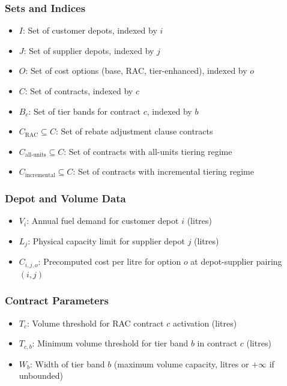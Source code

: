 \subsubsection{Sets and Indices}
\begin{itemize}
    \item $I$: Set of customer depots, indexed by $i$
    \item $J$: Set of supplier depots, indexed by $j$ 
    \item $O$: Set of cost options (base, RAC, tier-enhanced), indexed by $o$
    \item $C$: Set of contracts, indexed by $c$
    \item $B_c$: Set of tier bands for contract $c$, indexed by $b$
    \item $C_{\text{RAC}} \subseteq C$: Set of rebate adjustment clause contracts
    \item $C_{\text{all-units}} \subseteq C$: Set of contracts with all-units tiering regime
    \item $C_{\text{incremental}} \subseteq C$: Set of contracts with incremental tiering regime
\end{itemize}

\subsubsection{Depot and Volume Data}
\begin{itemize}
    \item $V_i$: Annual fuel demand for customer depot $i$ (litres)
    \item $L_j$: Physical capacity limit for supplier depot $j$ (litres)
    \item $C_{i,j,o}$: Precomputed cost per litre for option $o$ at depot-supplier pairing $(i,j)$
\end{itemize}

\subsubsection{Contract Parameters}
\begin{itemize}
    \item $T_c$: Volume threshold for RAC contract $c$ activation (litres)
    \item $T_{c,b}$: Minimum volume threshold for tier band $b$ in contract $c$ (litres)
    \item $W_b$: Width of tier band $b$ (maximum volume capacity, litres or $+\infty$ if unbounded)
\end{itemize}

